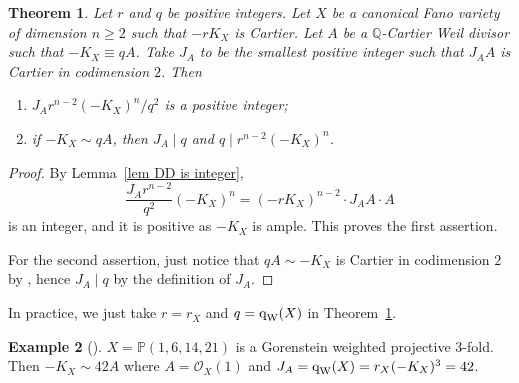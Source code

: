\documentclass[12pt,twoside]{amsart}
\newcommand{\qW}{\text{\rm q}_{\text{\rm W}}}
\newtheorem{thm}{Theorem}[section]
\theoremstyle{definition}
\newtheorem{ex}[thm]{Example}
\begin{document}
\begin{thm}\label{thm.key}
 Let $r$ and $q$ be positive integers. Let $X$ be a canonical Fano variety of dimension $n\geq 2$ such that $-rK_X$ is Cartier. %
 Let $A$ be a $\mathbb{Q}$-Cartier Weil divisor such that $-K_X\equiv qA$. Take $J_A$ to be the smallest positive integer such that $J_AA$ is Cartier in codimension $2$. 
 Then 
 \begin{enumerate}
 \item $ J_Ar^{n-2}(-K_X)^n/q^2$ is a positive integer; %

 \item if $-K_X\sim qA$, then $J_A\mid q$ and $q \mid r^{n-2}(-K_X)^n$.
 \end{enumerate}
\end{thm}

\begin{proof}
By Lemma~\ref{lem DD is integer}, \[\frac{J_Ar^{n-2}}{q^2}(-K_X)^n=(-rK_X)^{n-2}\cdot J_AA\cdot A\] is an integer, and it is positive as $-K_X$ is ample. This proves the first assertion.

For the second assertion, just notice that $qA\sim -K_X$ is Cartier in codimension $2$ by \cite[{Corollary~5.18}]{KollarMori1998}, hence $J_A\mid q$ by the definition of $J_A$. 
\end{proof}


In practice, we just take $r=r_X$ and $q=\qW(X)$ in Theorem~\ref{thm.key}.

\begin{ex}[{\cite[{Table~1}]{DedieuSernesi2023}}]\label{ex.gor}
$X=\mathbb P(1,6,14,21)$ is a Gorenstein weighted projective $3$-fold. Then $-K_X\sim 42A$ where $A=\mathcal{O}_X(1)$ and $J_A=\qW(X)=r_X(-K_X)^3=42$.
\end{ex}
\end{document}
